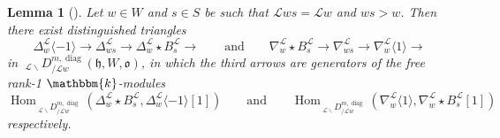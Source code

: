 \documentclass{amsart}
\renewcommand{\k}{\mathbbm{k}}
\newcommand{\scrL}{\mathcal{L}}
\DeclareMathOperator{\Hom}{Hom}
\newcommand{\fr}[1]{\mathfrak{#1}}
\DeclareMathOperator{\diag}{diag}
\newcommand{\DDBE}[2]{\:_{#1 \backslash} D_{/ #2}^{m, \diag}}
\newtheorem{lemma}[subsubsection]{Lemma}
\theoremstyle{definition}
\numberwithin{equation}{subsection}
\begin{document}
\begin{lemma}[{\cite[Lemma 6.10]{ARV}}]\label{lem:mixed_push_pull_dts}
    Let $w \in W$ and $s \in S$ be such that $\scrL ws = \scrL w$ and $ws > w$. Then there exist distinguished triangles
    \[\Delta_w^{\scrL} \langle -1\rangle \to \Delta_{ws}^{\scrL} \to \Delta_{w}^{\scrL} \star B_{s}^{\scrL} \to \qquad\text{and}\qquad \nabla_w^{\scrL} \star B_s^{\scrL} \to \nabla_{ws}^{\scrL} \to \nabla_w^{\scrL} \langle 1 \rangle \to \]
    in $\DDBE{\scrL}{\scrL w} (\fr{h}, W, \fr{o})$, in which the third arrows are generators of the free rank-1 $\k$-modules
    \[\Hom_{\DDBE{\scrL}{\scrL w}} (\Delta_{w}^{\scrL} \star B_{s}^{\scrL}, \Delta_w^{\scrL} \langle -1 \rangle [1]) \qquad\text{and}\qquad \Hom_{\DDBE{\scrL}{\scrL w}} (\nabla_w^{\scrL} \langle 1 \rangle, \nabla_w^{\scrL} \star B_s^{\scrL} [1])\]
    respectively.
\end{lemma}
\end{document}
